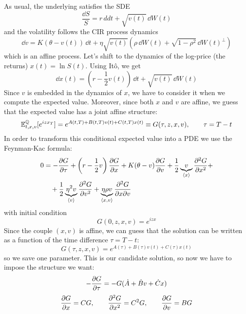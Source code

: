  As usual, the underlying satisfies the SDE
\begin{equation*}
    \frac{\dd S}{S} = r\,dd t + \sqrt{v(t)}\,\dd W(t)
\end{equation*}
and the volatility follows the CIR process dynamics
\begin{equation}
    \dd v = K(\theta-v(t))\,\dd t + \eta\sqrt{v(t)}(\rho\,\dd W(t) + \sqrt{1-\rho^2}\,\dd W(t)^{\perp})
\end{equation}
which is an affine process. Let's shift to the dynamics of the log-price (the returns) $x(t)=\ln S(t)$. Using Itô, we get
\begin{equation}
    \dd x(t) = \left(r-\frac{1}{2}v(t)\right)\,\dd t + \sqrt{v(t)}\,\dd W(t)
\end{equation}
Since $v$ is embedded in the dynamics of $x$, we have to consider it when we compute the expected value. Moreover, since both $x$ and $v$ are affine, we guess that the expected value has a joint affine structure:
\begin{equation}
    \mathbb{E}^{\mathbb{Q}}_{t,x,v}[e^{izx_T}] = e^{A(t,T)+B(t,T)v(t)+C(t,T)x(t)} \equiv G(\tau,z,x,v), \qquad \tau = T-t
\end{equation}
In order to transform this conditional expected value into a PDE we use the Feynman-Kac formula:
\begin{align}\label{FKh}
    \notag 0 &= - \pdv{G}{\tau} + \left(r-\frac{1}{2}v\right)\pdv{G}{x} + K(\theta-v)\pdv{G}{v} + \frac{1}{2}\underbrace{v}_{\expval{x}}\pdv[2]{G}{x} + \\
    &\quad + \frac{1}{2}\underbrace{\eta^2 v}_{\expval{v}}\pdv[2]{G}{v} + \underbrace{\eta\rho v}_{\expval{x,v}} \pdv{G}{x}{v}
\end{align}
with initial condition
\begin{equation*}
    G(0,z,x,v) = e^{izx}
\end{equation*}
Since the couple $(x,v)$ is affine, we can guess that the solution can be written as a function of the time difference $\tau=T-t$:
\begin{equation*}
    G(\tau, z,x,v) = e^{A(\tau)+B(\tau)v(t)+C(\tau)x(t)}
\end{equation*}
so we save one parameter. This is our candidate solution, so now we have to impose the structure we want:
\begin{align*}
    -\pdv{G}{\tau} = -G(\dot{A}+\dot{B}v+\dot{C}x)
\end{align*}
\begin{align*}
    \pdv{G}{x} = CG, \qquad \pdv[2]{G}{x} = C^2G, \qquad \pdv{G}{v} = BG
\end{align*}
